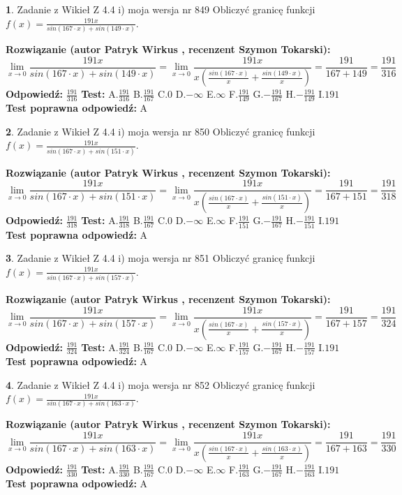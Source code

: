 \documentclass[12pt, a4paper]{article}
\theoremstyle{definition} %
\newtheorem{zad}{}
\newcommand{\zadStart}[1]{\begin{zad}#1\newline}
\newcommand{\zadStop}{\end{zad}}
\newcommand{\rozwStart}[2]{\noindent \textbf{Rozwiązanie (autor #1 , recenzent #2): }\newline}
\newcommand{\rozwStop}{\newline}
\newcommand{\odpStart}{\noindent \textbf{Odpowiedź:}\newline}
\newcommand{\odpStop}{\newline}
\newcommand{\testStart}{\noindent \textbf{Test:}\newline}
\newcommand{\testStop}{\newline}
\newcommand{\kluczStart}{\noindent \textbf{Test poprawna odpowiedź:}\newline}
\newcommand{\kluczStop}{\newline}
\begin{document}
\zadStart{Zadanie z Wikieł Z 4.4 i) moja wersja nr 849}
Obliczyć granicę funkcji $f(x)=\frac{191x}{sin(167\cdot x) +sin(149\cdot x)}$.
\zadStop
\rozwStart{Patryk Wirkus}{Szymon Tokarski}
$$\lim\limits_{x\to 0}\frac{191x}{sin(167\cdot x) +sin(149\cdot x)}=\lim\limits_{x\to 0}\frac{191x}{x(\frac{sin(167\cdot x)}{x}+\frac{sin(149\cdot x)}{x})}=\frac{191}{167+149} = \frac{191}{316}$$
\rozwStop
\odpStart
$\frac{191}{316}$
\odpStop
\testStart
A.$\frac{191}{316}$
B.$\frac{191}{167}$
C.$0$
D.$-\infty$
E.$\infty$
F.$\frac{191}{149}$
G.$-\frac{191}{167}$
H.$-\frac{191}{149}$
I.$191$
\testStop
\kluczStart
A
\kluczStop



\zadStart{Zadanie z Wikieł Z 4.4 i) moja wersja nr 850}
Obliczyć granicę funkcji $f(x)=\frac{191x}{sin(167\cdot x) +sin(151\cdot x)}$.
\zadStop
\rozwStart{Patryk Wirkus}{Szymon Tokarski}
$$\lim\limits_{x\to 0}\frac{191x}{sin(167\cdot x) +sin(151\cdot x)}=\lim\limits_{x\to 0}\frac{191x}{x(\frac{sin(167\cdot x)}{x}+\frac{sin(151\cdot x)}{x})}=\frac{191}{167+151} = \frac{191}{318}$$
\rozwStop
\odpStart
$\frac{191}{318}$
\odpStop
\testStart
A.$\frac{191}{318}$
B.$\frac{191}{167}$
C.$0$
D.$-\infty$
E.$\infty$
F.$\frac{191}{151}$
G.$-\frac{191}{167}$
H.$-\frac{191}{151}$
I.$191$
\testStop
\kluczStart
A
\kluczStop



\zadStart{Zadanie z Wikieł Z 4.4 i) moja wersja nr 851}
Obliczyć granicę funkcji $f(x)=\frac{191x}{sin(167\cdot x) +sin(157\cdot x)}$.
\zadStop
\rozwStart{Patryk Wirkus}{Szymon Tokarski}
$$\lim\limits_{x\to 0}\frac{191x}{sin(167\cdot x) +sin(157\cdot x)}=\lim\limits_{x\to 0}\frac{191x}{x(\frac{sin(167\cdot x)}{x}+\frac{sin(157\cdot x)}{x})}=\frac{191}{167+157} = \frac{191}{324}$$
\rozwStop
\odpStart
$\frac{191}{324}$
\odpStop
\testStart
A.$\frac{191}{324}$
B.$\frac{191}{167}$
C.$0$
D.$-\infty$
E.$\infty$
F.$\frac{191}{157}$
G.$-\frac{191}{167}$
H.$-\frac{191}{157}$
I.$191$
\testStop
\kluczStart
A
\kluczStop



\zadStart{Zadanie z Wikieł Z 4.4 i) moja wersja nr 852}
Obliczyć granicę funkcji $f(x)=\frac{191x}{sin(167\cdot x) +sin(163\cdot x)}$.
\zadStop
\rozwStart{Patryk Wirkus}{Szymon Tokarski}
$$\lim\limits_{x\to 0}\frac{191x}{sin(167\cdot x) +sin(163\cdot x)}=\lim\limits_{x\to 0}\frac{191x}{x(\frac{sin(167\cdot x)}{x}+\frac{sin(163\cdot x)}{x})}=\frac{191}{167+163} = \frac{191}{330}$$
\rozwStop
\odpStart
$\frac{191}{330}$
\odpStop
\testStart
A.$\frac{191}{330}$
B.$\frac{191}{167}$
C.$0$
D.$-\infty$
E.$\infty$
F.$\frac{191}{163}$
G.$-\frac{191}{167}$
H.$-\frac{191}{163}$
I.$191$
\testStop
\kluczStart
A
\kluczStop
\end{document}
